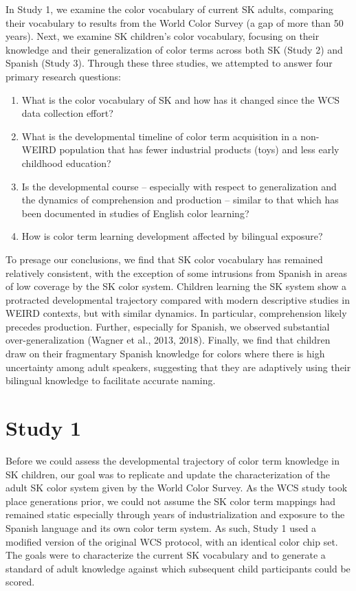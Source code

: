 \documentclass[
  english,
  ,man,floatsintext]{apa6}
\providecommand{\tightlist}{%
  \setlength{\itemsep}{0pt}\setlength{\parskip}{0pt}}
\begin{document}
In Study 1, we examine the color vocabulary of current SK adults, comparing their vocabulary to results from the World Color Survey (a gap of more than 50 years). Next, we examine SK children's color vocabulary, focusing on their knowledge and their generalization of color terms across both SK (Study 2) and Spanish (Study 3). Through these three studies, we attempted to answer four primary research questions:

\begin{enumerate}
\def\labelenumi{\arabic{enumi}.}
\tightlist
\item
  What is the color vocabulary of SK and how has it changed since the WCS data collection effort?
\item
  What is the developmental timeline of color term acquisition in a non-WEIRD population that has fewer industrial products (toys) and less early childhood education?
\item
  Is the developmental course -- especially with respect to generalization and the dynamics of comprehension and production -- similar to that which has been documented in studies of English color learning?
\item
  How is color term learning development affected by bilingual exposure?
\end{enumerate}

To presage our conclusions, we find that SK color vocabulary has remained relatively consistent, with the exception of some intrusions from Spanish in areas of low coverage by the SK color system. Children learning the SK system show a protracted developmental trajectory compared with modern descriptive studies in WEIRD contexts, but with similar dynamics. In particular, comprehension likely precedes production. Further, especially for Spanish, we observed substantial over-generalization (Wagner et al., 2013, 2018). Finally, we find that children draw on their fragmentary Spanish knowledge for colors where there is high uncertainty among adult speakers, suggesting that they are adaptively using their bilingual knowledge to facilitate accurate naming.

\hypertarget{study-1}{%
\section{Study 1}\label{study-1}}

Before we could assess the developmental trajectory of color term knowledge in SK children, our goal was to replicate and update the characterization of the adult SK color system given by the World Color Survey. As the WCS study took place generations prior, we could not assume the SK color term mappings had remained static especially through years of industrialization and exposure to the Spanish language and its own color term system. As such, Study 1 used a modified version of the original WCS protocol, with an identical color chip set. The goals were to characterize the current SK vocabulary and to generate a standard of adult knowledge against which subsequent child participants could be scored.
\end{document}
